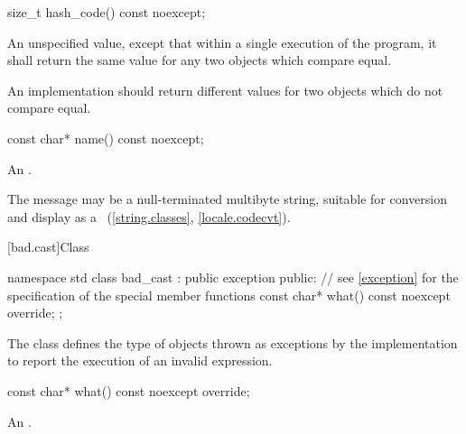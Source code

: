 %
\begin{itemdecl}
size_t hash_code() const noexcept;
\end{itemdecl}

\begin{itemdescr}
\pnum
\returns
An unspecified value, except that within a single execution of the
program, it shall return the same value for any two 
objects which compare equal.

\pnum
\remarks
An implementation should return different values for two
 objects which do not compare equal.
\end{itemdescr}


%
\begin{itemdecl}
const char* name() const noexcept;
\end{itemdecl}

\begin{itemdescr}
\pnum
\returns
An  \ntbs{}.

\pnum
\remarks
The message may be a null-terminated multibyte string,
suitable for conversion and display as a
~(\ref{string.classes}, \ref{locale.codecvt}).
\end{itemdescr}

[bad.cast]{Class }

%
%
\begin{codeblock}
namespace std {
  class bad_cast : public exception {
  public:
    // see \ref{exception} for the specification of the special member functions
    const char* what() const noexcept override;
  };
}
\end{codeblock}

\pnum
The class
defines the type of objects thrown
as exceptions by the implementation to report the execution of an invalid
%
expression.

%
\begin{itemdecl}
const char* what() const noexcept override;
\end{itemdecl}

\begin{itemdescr}
\pnum
\returns
An  \ntbs{}.
\end{itemdescr}

